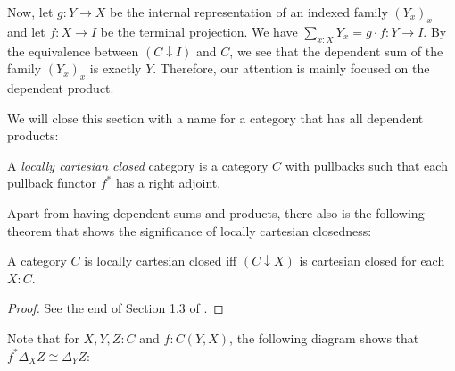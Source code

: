 Now, let $ g : Y \to X $ be the internal representation of an indexed family $ (Y_x)_x $ and let $ f : X \to I $ be the terminal projection. We have $ \sum_{x : X} Y_x = g \cdot f : Y \to I $. By the equivalence between $ (C \downarrow I) $ and $ C $, we see that the dependent sum of the family $ (Y_x)_x $ is exactly $ Y $. Therefore, our attention is mainly focused on the dependent product.

We will close this section with a name for a category that has all dependent products:

\begin{definition}
  A \textit{locally cartesian closed} category is a category $ C $ with pullbacks such that each pullback functor $ f^* $ has a right adjoint.
\end{definition}

Apart from having dependent sums and products, there also is the following theorem that shows the significance of locally cartesian closedness:
\begin{lemma}\label{lem:locally-cartesian-closed}
  A category $ C $ is locally cartesian closed iff $ (C \downarrow X) $ is cartesian closed for each $ X : C $.
\end{lemma}
\begin{proof}
  See the end of Section 1.3 of \autocite{freyd}.
\end{proof}

\begin{remark}\label{rem:pullback-of-projection}
  Note that for $ X, Y, Z : C $ and $ f: C(Y, X) $, the following diagram shows that $ f^* \Delta_X Z \cong \Delta_Y Z $:
  \begin{center}
  \end{center}
\end{remark}

